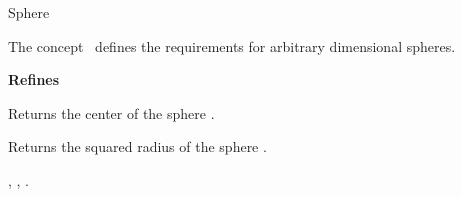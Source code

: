

\begin{ccRefConcept}{Sphere}


\ccDefinition
  
The concept \ccRefName\ defines the requirements for arbitrary dimensional spheres.

{\bf Refines}



\ccTypes






\ccOperations

{Returns the center of the sphere \ccVar.}


{Returns the squared radius of the sphere \ccVar.}


\ccHasModels

, , 
.



\end{ccRefConcept}


